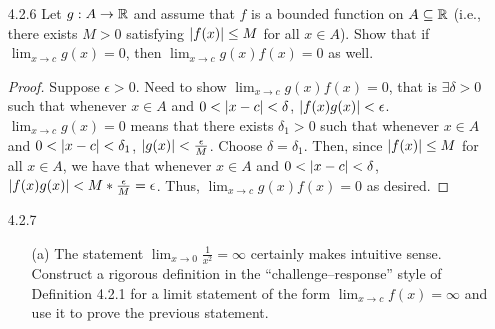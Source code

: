 \documentclass[12pt,letterpaper]{article}
\begin{document}
\begin{itemize}[leftmargin=!,labelindent=5pt]
\begin{itemize}
\begin{proof}
                            Now choose $\delta = \min{\{\delta_1, \delta_2, \delta_3\}}$.
                            Then, we have that
                                \begin{align*}
                                    \abs{(f(x)g(x)) - LM} &< \abs{f(x)}\frac{\epsilon}{2(\abs{L}+1)} + M\frac{\epsilon}{2M}\\
                                    &< (\abs{L}+1)\frac{\epsilon}{2(\abs{L}+1)} + M\frac{\epsilon}{2M}\\
                                    &= \frac{\epsilon}{2} + \frac{\epsilon}{2} = \epsilon
                                \end{align*}
                            whenever $x \in A$ and $0 < \abs{x - c} < \delta$ and $M \neq 0$.
                            So, $\lim_{x \to c} [f(x)g(x)] = LM$.
                        \end{proof}
            \end{itemize}
        \item [4.2.6] Let $g : A \to \mathbb{R}$ and assume that $f$ is a bounded function on $A \subseteq \mathbb{R}$ (i.e., there exists $M > 0$ satisfying $\abs{f(x)} \leq M$ for all $x \in A$). Show that if $\lim_{x \to c} g(x) = 0$, then $\lim_{x \to c} g(x)f(x) = 0$ as well.
            \begin{proof}
                Suppose $\epsilon > 0$.
                Need to show $\lim_{x \to c} g(x)f(x) = 0$, that is $\exists \delta > 0$ such that whenever $x \in A$ and $0 < \abs{x-c} < \delta$, $\abs{f(x)g(x)} < \epsilon$.
                $\lim_{x \to c} g(x) = 0$ means that there exists $\delta_1>0$ such that whenever $x \in A$ and $0 < \abs{x-c} < \delta_1$, $\abs{g(x)} < \frac{\epsilon}{M}$.
                Choose $\delta = \delta_1$.
                Then, since $\abs{f(x)} \leq M$ for all $x \in A$, we have that whenever $x \in A$ and $0 < \abs{x-c} < \delta$, $\abs{f(x)g(x)} < M *\frac{\epsilon}{M} = \epsilon$.
                Thus, $\lim_{x \to c} g(x)f(x) = 0$ as desired.
            \end{proof}
        \item [4.2.7] 
            \begin{itemize}
                \item [(a)] The statement $\lim_{x \to 0} \frac{1}{x^2} = \infty$ certainly makes intuitive sense. Construct a rigorous definition in the “challenge–response” style of Definition 4.2.1 for a limit statement of the form $\lim_{x \to c} f(x) = \infty$ and use it to prove the previous statement.


\end{itemize}
\end{itemize}
\end{document}
